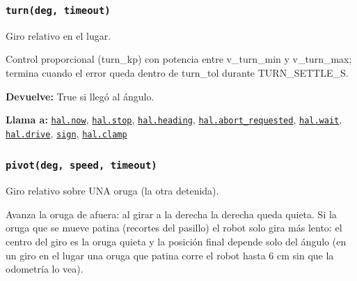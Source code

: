 \subsubsection{\texttt{turn(deg, timeout)}}\label{fn:motion:turn}
\noindent Giro relativo en el lugar.

Control proporcional (turn\_kp) con potencia entre v\_turn\_min y v\_turn\_max; termina cuando el error queda dentro de turn\_tol durante TURN\_SETTLE\_S.

\par{}\par\smallskip
\noindent\textbf{Devuelve:} True si llegó al ángulo.\par
\noindent\textbf{Llama a:} \hyperref[fn:hal:now]{\texttt{hal.now}}, \hyperref[fn:hal:stop]{\texttt{hal.stop}}, \hyperref[fn:hal:heading]{\texttt{hal.heading}}, \hyperref[fn:hal:abort-requested]{\texttt{hal.abort\_\allowbreak{}requested}}, \hyperref[fn:hal:wait]{\texttt{hal.wait}}, \hyperref[fn:hal:drive]{\texttt{hal.drive}}, \hyperref[fn:motion:sign]{\texttt{sign}}, \hyperref[fn:hal:clamp]{\texttt{hal.clamp}}\par

\subsubsection{\texttt{pivot(deg, speed, timeout)}}\label{fn:motion:pivot}
\noindent Giro relativo sobre UNA oruga (la otra detenida).

Avanza la oruga de afuera: al girar a la derecha la derecha queda quieta. Si la oruga que se mueve patina (recortes del pasillo) el robot solo gira más lento: el centro del giro es la oruga quieta y la posición final depende solo del ángulo (en un giro en el lugar una oruga que patina corre el robot hasta 6 cm sin que la odometría lo vea).

